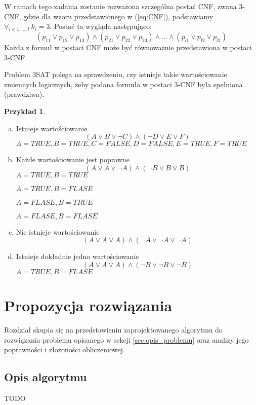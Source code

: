 \documentclass[a4paper,11pt,twoside]{report}
\theoremstyle{definition}
\newtheorem{example}[theorem]{Przykład}
\begin{document}
W ramach tego zadania zostanie rozważona szczególna postać CNF, zwana 3-CNF, gdzie dla wzoru przedstawionego w (\ref{eq:CNF}), podstawiamy $\forall_{i\in {1, \dots , l }}\ k_i = 3$. Postać ta wygląda następująco:
\begin{equation}
\label{eq:3CNF}
(p_{11} \lor p_{12} \lor p_{13})\land (p_{21} \lor p_{22} \lor p_{23})\land\dots\land (p_{l1} \lor p_{l2} \lor p_{l3})
\end{equation}
Każda z formuł w postaci CNF może być równoważnie przedstawiona w postaci 3-CNF.

Problem 3SAT polega na sprawdzeniu, czy istnieje takie wartościowanie zmiennych logicznych, żeby podana formuła w postaci 3-CNF była spełniona (prawdziwa).

\begin{example} \hfill
\begin{enumerate}[(a)]
    \item Istnieje wartościowanie
    $$(A\lor B\lor\lnot C)\land (\lnot D\lor E\lor F)$$
    $A=TRUE, B=TRUE, C=FALSE, D=FALSE, E=TRUE, F=TRUE$
    \item Każde wartościowanie jest poprawne
    $$(A\lor A\lor\lnot A)\land (\lnot B\lor B\lor B)$$
    $A=TRUE, B=TRUE$
    
    $A=TRUE, B=FLASE$

    $A=FLASE, B=TRUE$
    
    $A=FLASE, B=FLASE$
    \item Nie istnieje wartościowanie
    $$(A\lor A\lor A)\land (\lnot A\lor \lnot A\lor \lnot A)$$
    \item Istnieje dokładnie jedno wartościowanie
    $$(A\lor A\lor A)\land (\lnot B\lor\lnot B\lor\lnot B)$$
    $A=TRUE, B=FLASE$
\end{enumerate}
\end{example}


\chapter{Propozycja rozwiązania}

Rozdział skupia się na przedstawieniu zaprojektowanego algorytmu do rozwiązania problemu opisanego w sekcji \ref{sec:opis_problemu} oraz analizy jego poprawności i złożoności obliczeniowej.

\section{Opis algorytmu}\label{sec:algorytm}
TODO
\end{document}
